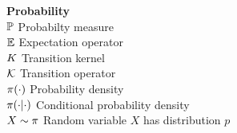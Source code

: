{\bf {\large Probability}}\\
$\mathbb{P} \dotfill$ Probabilty measure\\
$\mathbb{E} \dotfill$ Expectation operator\\
$K \dotfill$ Transition kernel\\
$\K \dotfill$ Transition operator\\
$\pi(\cdot) \dotfill$ Probability density\\
$\pi(\cdot|\cdot) \dotfill$ Conditional probability density\\
$X\sim \pi \dotfill$ Random variable $X$ has distribution $p$ \\
\pagebreak
